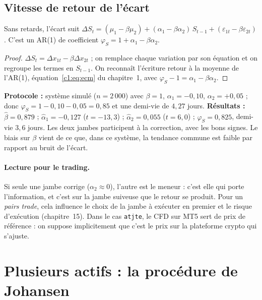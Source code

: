 \subsection{Vitesse de retour de l'écart}

\begin{proposition}\label{c4:prop:ecm}
Sans retards, l'écart suit $\Delta S_t = (\mu_1 - \beta\mu_2) + (\alpha_1 - \beta\alpha_2)\,S_{t-1} + (\varepsilon_{1t} - \beta\varepsilon_{2t})$. C'est un AR(1) de coefficient $\varphi_S = 1 + \alpha_1 - \beta\alpha_2$.
\end{proposition}
\begin{proof}
$\Delta S_t = \Delta x_{1t} - \beta\Delta x_{2t}$ ; on remplace chaque variation par son équation et on regroupe les termes en $S_{t-1}$. On reconnaît l'écriture \og retour à la moyenne\fg{} de l'AR(1), équation~\eqref{c1:eq:ecm} du chapitre~1, avec $\varphi_S - 1 = \alpha_1 - \beta\alpha_2$.
\end{proof}

\begin{codebox}
\textbf{Protocole :} système simulé ($n = 2\,000$) avec $\beta = 1$, $\alpha_1 = -0{,}10$, $\alpha_2 = +0{,}05$ ; donc $\varphi_S = 1 - 0{,}10 - 0{,}05 = 0{,}85$ et une demi-vie de $4{,}27$ jours. \textbf{Résultats :} $\hat\beta = 0{,}879$ ; $\hat\alpha_1 = -0{,}127$ ($t = -13{,}3$) ; $\hat\alpha_2 = 0{,}055$ ($t = 6{,}0$) ; $\hat\varphi_S = 0{,}825$, demi-vie $3{,}6$ jours. Les deux jambes participent à la correction, avec les bons signes. Le biais sur $\beta$ vient de ce que, dans ce système, la tendance commune est faible par rapport au bruit de l'écart.
\end{codebox}

\paragraph{Lecture pour le trading.} Si seule une jambe corrige ($\alpha_2 \approx 0$), l'autre est le \og meneur\fg{} : c'est elle qui porte l'information, et c'est sur la jambe suiveuse que le retour se produit. Pour un \emph{pairs trade}, cela influence le choix de la jambe à exécuter en premier et le risque d'exécution (chapitre~15). Dans le cas \texttt{atjte}, le CFD sur MT5 sert de prix de référence : on suppose implicitement que c'est le prix sur la plateforme crypto qui s'ajuste.

\section{Plusieurs actifs : la procédure de Johansen}


